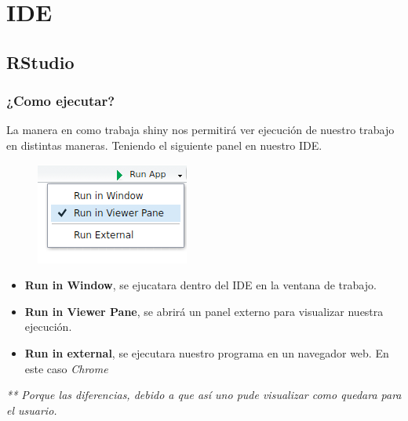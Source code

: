 \documentclass{beamer}
\begin{document}
\section{IDE}
\subsection{RStudio}
\begin{frame}
	\frametitle{¿Como ejecutar? }
	\begin{multicols}{2}
		La manera en como trabaja shiny nos permitirá ver ejecución de nuestro trabajo en distintas maneras. Teniendo el siguiente panel en nuestro IDE.
		\begin{figure}[h!]
			\includegraphics[scale=0.5]{run}
		\end{figure}
		
		\begin{itemize}
			\item \textbf{Run in Window}, se ejucatara dentro del IDE en la ventana de trabajo.
			\item \textbf{Run in Viewer Pane}, se abrirá un panel externo para visualizar nuestra ejecución.
			\item \textbf{Run in external},  se ejecutara nuestro programa en un navegador web. En este caso \textit{Chrome}
		\end{itemize}
	\end{multicols}
	\textit{** Porque las diferencias, debido a que así uno pude visualizar como quedara para el usuario.}
\end{frame}
\end{document}
